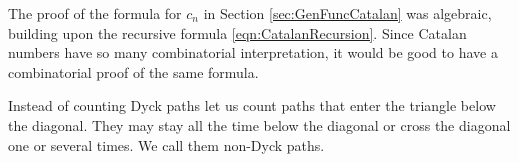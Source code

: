 

\setcounter{section}{4}
\setcounter{subsection}{6}
\setcounter{dfn}{9}

The proof of the formula for $c_n$ in Section \ref{sec:GenFuncCatalan} was algebraic,
building upon the recursive formula \eqref{eqn:CatalanRecursion}.
Since Catalan numbers have so many combinatorial interpretation, it would be good to have a combinatorial proof of the same formula.

Instead of counting Dyck paths let us count paths that enter the triangle below the diagonal.
They may stay all the time below the diagonal or cross the diagonal one or several times.
We call them non-Dyck paths.


